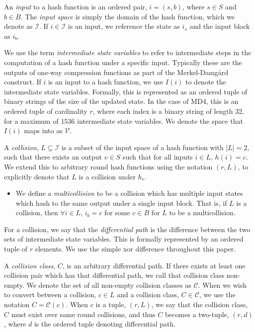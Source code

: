 \documentclass[conference]{IEEEtran}
\begin{document}
An \textit{input} to a hash function is an ordered pair, $i = (s, b)$,
where $s \in S$ and $b \in B$. The \textit{input space} is simply
the domain of the hash function, which we denote as $\mathcal{I}$.
If $i \in \mathcal{I}$ is an input, we reference the state as $i_s$
and the input block as $i_b$.

We use the term \textit{intermediate state variables} to refer to
intermediate steps in the computation of a hash function under
a specific input. Typically these are the outputs of
one-way compression functions as part of the Merkel-Damg{\aa}rd
construct. If $i$ is an input to a hash function, we use $I(i)$ to
denote the intermediate state variables. Formally, this is represented
as an ordered tuple of binary strings of the size of the updated state.
In the case of MD4, this is an ordered tuple of cardinality $r$, where
each index is a binary string of length 32, for a maximum of $1536$
intermediate state variables. We denote the space that $I(i)$ maps
into as $\mathcal{V}$.

A \textit{collision}, $L \subseteq \mathcal{I}$ is a subset of the
input space of a hash function with $\big|L\big| = 2$, such that
there exists an output $v \in S$ such that for all inputs $i \in L$,
$h(i) = c$. We extend this to arbitrary round hash functions using
the notation $(r, L)$, to explicitly denote that $L$ is a collision
under $h_{r}$.

\begin{itemize}
\item We define a \textit{multicollision} to be a collision which
  has multiple input states which hash to the same output under
  a single input block. That is, if $L$ is a collision, then
  $\forall i \in L$, $i_b = c$ for some $c \in B$ for $L$ to be
  a multicollision.
\end{itemize}

For a collision, we say that the \textit{differential path}
is the difference between the two sets of intermediate state
variables. This is formally represented by an ordered tuple of
$r$ elements. We use the simple xor difference throughout this paper.

A \textit{collision class}, $C$, is an arbitrary differential path.
If there exists at least one collision pair which has that differential
path, we call that collision class non-empty. We denote the set of all
non-empty collision classes as $\mathcal{C}$. When we wish to convert
between a collision, $c \in L$ and a collision class,
$C \in \mathcal{C}$, we use the notation $C = \mathcal{C}(c)$. When
$c$ is a tuple, $(r, L)$, we say that the collision class, $C$
must exist over same round collisions, and thus $C$ becomes a
two-tuple, $(r, d)$, where $d$ is the ordered tuple denoting
differential path.
\end{document}
